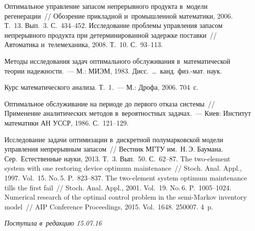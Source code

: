 \begin{multicols}{2}
{{\begin{thebibliography}{99}
 Оптимальное управление запасом 
непрерывного продукта в~модели регенерации~// Обозрение прикладной 
и~промышленной математики, 2006. Т.~13. Вып.~3. С.~434--452.
Исследование проб\-ле\-мы управления запасом непрерывного продукта при детерминированной 
задержке поставки~// Автоматика и~телемеханика, 2008. Т.~10. С.~93--113.


 Методы исследования задач оптимального обслуживания 
в~математической теории надежности.~--- 
М.: МИЭМ, 1983.  Дисс.\ \ldots\ канд. физ.-мат. наук.

 Курс математического анализа. Т.~1.~--- 
М.: Дрофа, 2006. 704~с.

 Оптимальное обслуживание на периоде 
до первого отказа системы~// Применение аналитических методов в~вероятностных
 задачах.~--- Киев: Институт математики АН УССР, 1986. С.~121--129.

 Исследование задачи оптимизации в~дискретной 
полумарковской модели управления непрерывным запасом~// Вестник МГТУ им.\ 
Н.\,Э. Баумана. Сер.\ Естественные науки, 2013. Т.~3. Вып.~50. С.~62--87.
\bibitem{30} 
 The two-element system with one 
restoring device optimum maintenance~// Stoch. Anal. Appl., 1997. 
Vol.~15. No.\,5. P.~823--837.
 The two-element system optimum maintenance tills the first fail~// 
Stoch. Anal. Appl., 2001. Vol.~19. No.\,6. P.~1005--1024.
 Numerical research of the optimal control problem in the semi-Markov 
inventory model~// AIP Conference Proceedings, 2015. Vol.~1648. {250007}. 4~p.
 \end{thebibliography}

 }
 }

\end{multicols}

\vspace*{-6pt}

\hfill{\small\textit{Поступила в~редакцию 15.07.16}}

